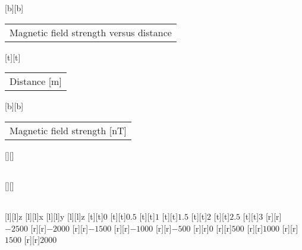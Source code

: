%
[b][b]{\fontsize{8}{12}\selectfont \setlength{\tabcolsep}{0pt}\begin{tabular}{c}Magnetic field strength versus distance\end{tabular}}%
[t][t]{\fontsize{8}{12}\selectfont \setlength{\tabcolsep}{0pt}\begin{tabular}{c}Distance [m]\end{tabular}}%
[b][b]{\fontsize{8}{12}\selectfont \setlength{\tabcolsep}{0pt}\begin{tabular}{c}Magnetic field strength [nT]\end{tabular}}%
[][]{\fontsize{10}{15}\selectfont \setlength{\tabcolsep}{0pt}\begin{tabular}{c} \end{tabular}}%
[][]{\fontsize{10}{15}\selectfont \setlength{\tabcolsep}{0pt}\begin{tabular}{c} \end{tabular}}%
[l][l]{\fontsize{8}{12}\selectfont z}%
[l][l]{\fontsize{8}{12}\selectfont x}%
[l][l]{\fontsize{8}{12}\selectfont y}%
[l][l]{\fontsize{8}{12}\selectfont z}%
%
\fontsize{8}{12}%
\selectfont%
%
[t][t]{$0$}%
[t][t]{$0.5$}%
[t][t]{$1$}%
[t][t]{$1.5$}%
[t][t]{$2$}%
[t][t]{$2.5$}%
[t][t]{$3$}%
%
[r][r]{$-2500$}%
[r][r]{$-2000$}%
[r][r]{$-1500$}%
[r][r]{$-1000$}%
[r][r]{$-500$}%
[r][r]{$0$}%
[r][r]{$500$}%
[r][r]{$1000$}%
[r][r]{$1500$}%
[r][r]{$2000$}%
%
